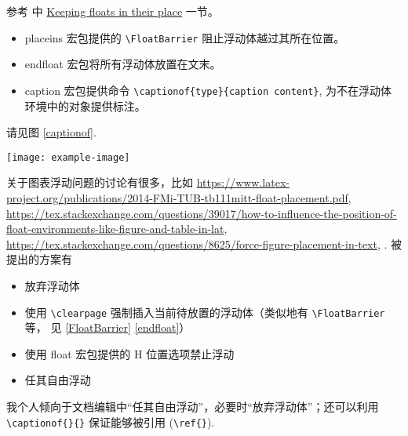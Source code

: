 参考 \cite{wiki:float} 中 \href{https://en.wikibooks.org/wiki/LaTeX/Floats,\_Figures\_and\_Captions\#Keeping\_floats\_in\_their\_place}{Keeping floats in their place} 一节。

\begin{itemize}
  \item\label{FloatBarrier} placeins 宏包提供的 \verb+\FloatBarrier+ 阻止浮动体越过其所在位置。
  \item\label{endfloat} endfloat 宏包将所有浮动体放置在文末。
  \item caption 宏包提供命令 \verb+\captionof{type}{caption content}+, 为不在浮动体环境中的对象提供标注。
\end{itemize}
\begin{sidelst}
请见图 \ref{captionof}.

\texttt{[image: example-image]}
\label{captionof}
\end{sidelst}

关于图表浮动问题的讨论有很多，比如 \url{https://www.latex-project.org/publications/2014-FMi-TUB-tb111mitt-float-placement.pdf}, \url{https://tex.stackexchange.com/questions/39017/how-to-influence-the-position-of-float-environments-like-figure-and-table-in-lat}, \url{https://tex.stackexchange.com/questions/8625/force-figure-placement-in-text}, \cite{placement}. 被提出的方案有
\begin{itemize}
  \item 放弃浮动体
  \item 使用 \verb+\clearpage+ 强制插入当前待放置的浮动体（类似地有 \verb+\FloatBarrier+ 等， 见 \ref{FloatBarrier} \ref{endfloat}）
  \item 使用 float 宏包提供的 H 位置选项禁止浮动
  \item 任其自由浮动
\end{itemize}
我个人倾向于文档编辑中“任其自由浮动”，必要时“放弃浮动体”；还可以利用 \verb+\captionof{}{}+ 保证能够被引用 (\verb+\ref{}+).